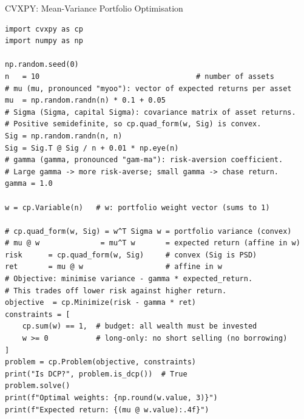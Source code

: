 \documentclass[aspectratio=169,10pt]{beamer}
\begin{document}
\begin{frame}[fragile]{CVXPY: Mean-Variance Portfolio Optimisation}
\begin{lstlisting}[caption={Markowitz mean-variance portfolio with CVXPY: balance return and risk}]
import cvxpy as cp
import numpy as np

np.random.seed(0)
n   = 10                                    # number of assets
# mu (mu, pronounced "myoo"): vector of expected returns per asset
mu  = np.random.randn(n) * 0.1 + 0.05
# Sigma (Sigma, capital Sigma): covariance matrix of asset returns.
# Positive semidefinite, so cp.quad_form(w, Sig) is convex.
Sig = np.random.randn(n, n)
Sig = Sig.T @ Sig / n + 0.01 * np.eye(n)
# gamma (gamma, pronounced "gam-ma"): risk-aversion coefficient.
# Large gamma -> more risk-averse; small gamma -> chase return.
gamma = 1.0

w = cp.Variable(n)   # w: portfolio weight vector (sums to 1)

# cp.quad_form(w, Sig) = w^T Sigma w = portfolio variance (convex)
# mu @ w              = mu^T w       = expected return (affine in w)
risk      = cp.quad_form(w, Sig)     # convex (Sig is PSD)
ret       = mu @ w                   # affine in w
# Objective: minimise variance - gamma * expected_return.
# This trades off lower risk against higher return.
objective  = cp.Minimize(risk - gamma * ret)
constraints = [
    cp.sum(w) == 1,  # budget: all wealth must be invested
    w >= 0           # long-only: no short selling (no borrowing)
]
problem = cp.Problem(objective, constraints)
print("Is DCP?", problem.is_dcp())  # True
problem.solve()
print(f"Optimal weights: {np.round(w.value, 3)}")
print(f"Expected return: {(mu @ w.value):.4f}")
\end{lstlisting}
\end{frame}
\end{document}
